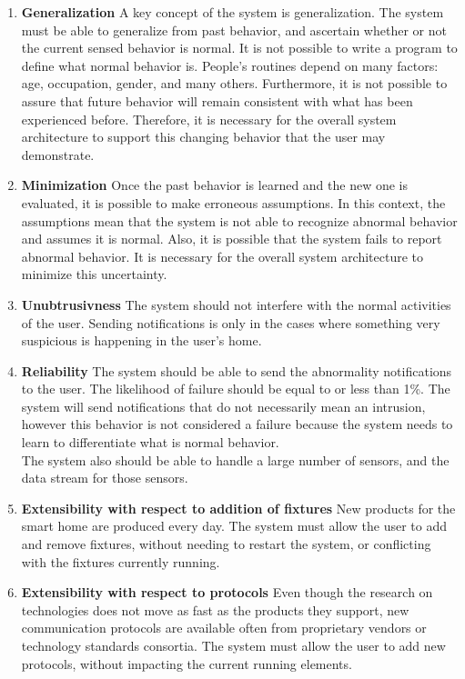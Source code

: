 \begin{enumerate}
\item \textbf{Generalization} 
A key concept of the system is generalization. The system must be able to generalize from past behavior, and ascertain whether or not the current sensed behavior is normal. It is not possible to write a program to define what normal behavior is. People's routines depend on many factors: age, occupation, gender, and many others. Furthermore, it is not possible to assure that future behavior will remain consistent with what has been experienced before. Therefore, it is necessary for the overall system architecture to support this changing behavior that the user may demonstrate.

\item \textbf{Minimization} 
Once the past behavior is learned and the new one is evaluated, it is possible to make erroneous assumptions. In this context, the assumptions mean that the system is not able to recognize abnormal behavior and assumes it is normal. Also, it is possible that the system fails to report abnormal behavior. It is necessary for the overall system architecture to minimize this uncertainty.

\item \textbf{Unubtrusivness}
The system should not interfere with the normal activities of the user. Sending notifications is only in the cases where something very suspicious is happening in the user's home.

\item \textbf{Reliability}
The system should be able to send the abnormality notifications to the user. The likelihood of failure should be equal to or less than 1\%. The system will send notifications that do not necessarily mean an intrusion, however this behavior is not considered a failure because the system needs to learn to differentiate what is normal behavior.  \\
The system also should be able to handle a large number of sensors, and the data stream for those sensors.

\item \textbf{Extensibility with respect to addition of fixtures}
New products for the smart home are produced every day. The system must allow the user to add and remove fixtures, without needing to restart the system, or conflicting with the fixtures currently running. 

\item \textbf{Extensibility with respect to protocols}
Even though the research on technologies does not move as fast as the products they support, new communication protocols are available often from proprietary vendors or technology standards consortia. The system must allow the user to add new protocols, without impacting the current running elements. 


\end{enumerate}
